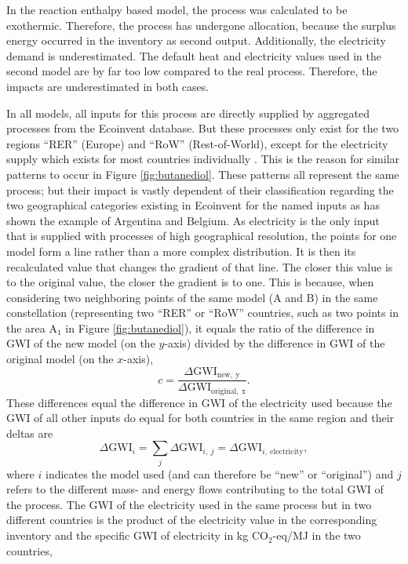 In the reaction enthalpy based model, the process was calculated to be exothermic. Therefore, the process has undergone allocation, because the surplus energy occurred in the inventory as second output. Additionally, the electricity demand is underestimated. The default heat and electricity values used in the second model are by far too low compared to the real process. Therefore, the impacts are underestimated in both cases.

In all models, all inputs for this process are directly supplied by aggregated  processes from the Ecoinvent database. But these processes only exist for the two regions ``RER'' (Europe) and ``RoW'' (Rest-of-World), except for the electricity supply which exists for most countries individually \cite{Ecoinvent.2020}. This is the reason for similar patterns to occur in Figure \ref{fig:butanediol}. These patterns all represent the same process; but their impact is vastly dependent of their classification regarding the two geographical categories existing in Ecoinvent for the named inputs as has shown the example of Argentina and Belgium. As electricity is the only input that is supplied with processes of high geographical resolution, the points for one model form a line rather than a more complex distribution. It is then its recalculated value that changes the gradient of that line. The closer this value is to the original value, the closer the gradient is to one. This is because, when considering two neighboring points of the same model (A and B) in the same constellation (representing two ``RER'' or ``RoW'' countries, such as two points in the area A$_1$ in Figure \ref{fig:butanediol}), it equals the ratio of the difference in GWI of the new model (on the $y$-axis) divided by the difference in GWI of the original model (on the $x$-axis),
$$
c = \frac{\Delta \mathrm{GWI}_\mathrm{new, \ y}}{\Delta \mathrm{GWI}_\mathrm{original, \ x}}.
$$
These differences equal the difference in GWI of the electricity used because the GWI of all other inputs do equal for both countries in the same region and their deltas are 
$$
\Delta \mathrm{GWI}_i = \sum_j \Delta \mathrm{GWI}_{i, \ j} = \Delta \mathrm{GWI}_{i, \ \mathrm{electricity}},
$$
where $i$ indicates the model used (and can therefore be ``new'' or ``original'') and $j$ refers to the different mass- and energy flows contributing to the total GWI of the process.
The GWI of the electricity used in the same process but in two different countries is the product of the electricity value in the corresponding inventory and the specific GWI of electricity in kg CO$_2$-eq/MJ in the two countries,
